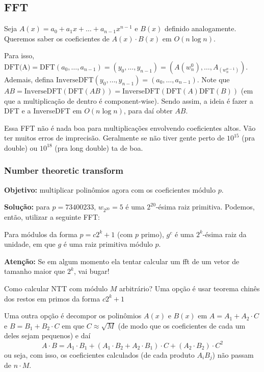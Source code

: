 \subsection{FFT}

Seja $A(x) = a_0 + a_1 x + \dots + a_{n-1} x^{n-1}$ e $B(x)$ definido analogamente. Queremos saber os coeficientes de $A(x) \cdot B(x)$ em $O(n \log n)$.

Para isso, $\text{DFT(A)} = \text{DFT}(a_0, \dots, a_{n-1}) =  (y_0, \dots, y_{n-1}) = (A(w_n^0), \dots, A_(w_n^{n-1}))$. Ademais, defina $\text{InverseDFT}(y_0, \dots, y_{n-1}) = (a_0, \dots, a_{n-1})$. Note que $AB = \text{InverseDFT}(\text{DFT}(AB)) = \text{InverseDFT}(\text{DFT}(A)\text{DFT}(B))$ (em que a multiplicação de dentro é component-wise). Sendo assim, a ideia é fazer a DFT e a InverseDFT em $O(n \log n)$, para daí obter $AB$.

Essa FFT não é nada boa para multiplicações envolvendo coeficientes altos. Vão ter muitos erros de imprecisão. Geralmente se não tiver gente perto de $10^{15}$ (pra double) ou $10^{18}$ (pra long double) ta de boa.


\subsubsection{Number theoretic transform}

\textbf{Objetivo:} multiplicar polinômios agora com os coeficientes módulo $p$. 

\textbf{Solução:} para $p=73400233$, $w_{2^{20}}=5$ é uma $2^{20}$-ésima raiz primitiva. Podemos, então, utilizar a seguinte FFT:


Para módulos da forma $p = c 2^k + 1$ (com $p$ primo), $g^c$ é uma $2^k$-ésima raiz da unidade, em que $g$ é uma raiz primitiva módulo $p$.

\textbf{Atenção:} Se em algum momento ela tentar calcular um fft de um vetor de tamanho maior que $2^k$, vai bugar!

Como calcular NTT com módulo $M$ arbitrário? Uma opção é usar teorema chinês dos restos em primos da forma $c2^k+1$

Uma outra opção é decompor os polinômios $A(x)$ e $B(x)$ em $A = A_1 + A_2 \cdot C$ e $B = B_1 + B_2 \cdot C$ em que $C \approx \sqrt{M}$ (de modo que os coeficientes de cada um deles sejam pequenos) e daí
$$ A \cdot B = A_1 \cdot B_1 + (A_1 \cdot B_2 + A_2 \cdot B_1) \cdot C + (A_2 \cdot B_2) \cdot C^2$$
ou seja, com isso, os coeficientes calculados (de cada produto $A_i B_j$) não passam de $n \cdot M$.

